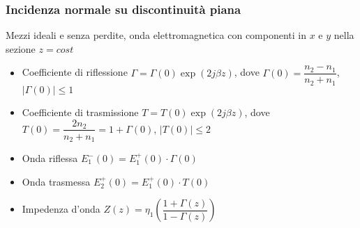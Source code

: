 \documentclass{article}
\begin{document}
\subsubsection{Incidenza normale su discontinuità piana}
Mezzi ideali e senza perdite, onda elettromagnetica con componenti in \( x \) e \( y \) nella sezione \( z = cost \)
\begin{itemize}
	\item Coefficiente di riflessione \( \Gamma = \Gamma(0) \exp(2 j \beta z)  \), dove \( \Gamma(0) = \dfrac{n_2 - n_1}{n_2 + n_1}\), \( | \Gamma(0) | \leq 1 \)
	\item Coefficiente di trasmissione \( T = T(0) \exp(2 j \beta z)  \), dove \( T(0) = \dfrac{2 n_2}{n_2 + n_1} = 1 + \Gamma(0)\), \( | T(0) | \leq 2 \)
	\item Onda riflessa \( E_1^-(0) =  E_1^+(0) \cdot \Gamma (0) \)
	\item Onda trasmessa \( E_2^+(0) =  E_1^+(0) \cdot T (0) \)
	\item Impedenza d'onda \( Z(z) = \eta_1 \left(\dfrac{1 + \Gamma(z)}{1 - \Gamma(z)}\right) \)
\end{itemize}
\end{document}
